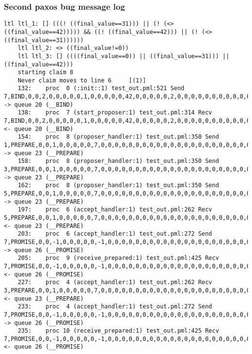 \subsubsection{Second paxos bug message log}
\begin{lstlisting}[xleftmargin=.01\linewidth, xrightmargin=0.01\linewidth, caption={Message passing caused by the proposer's protocol bug.}, label={lst:paxos_bug}]
    ltl ltl_1: [] (((! ((final_value==31))) || (! (<> ((final_value==42))))) && ((! ((final_value==42))) || (! (<> ((final_value==31))))))
    ltl ltl_2: <> ((final_value!=0))
    ltl ltl_3: [] ((((final_value==0)) || ((final_value==31))) || ((final_value==42)))
    starting claim 8
    Never claim moves to line 6     [(1)]
    132:    proc  0 (:init::1) test_out.pml:521 Send 7,BIND,0,0,2,0,0,0,0,0,1,0,0,0,0,0,42,0,0,0,0,0,2,0,0,0,0,0,0,0,0,0,0,0,0,0,0,0        -> queue 20 (__BIND)
    138:    proc  7 (start_proposer:1) test_out.pml:314 Recv 7,BIND,0,0,2,0,0,0,0,0,1,0,0,0,0,0,42,0,0,0,0,0,2,0,0,0,0,0,0,0,0,0,0,0,0,0,0,0        <- queue 20 (__BIND)
    154:    proc  8 (proposer_handler:1) test_out.pml:350 Send 1,PREPARE,0,0,1,0,0,0,0,0,7,0,0,0,0,0,0,0,0,0,0,0,0,0,0,0,0,0,0,0,0,0,0,0,0,0,0,0    -> queue 23 (__PREPARE)
    158:    proc  8 (proposer_handler:1) test_out.pml:350 Send 3,PREPARE,0,0,1,0,0,0,0,0,7,0,0,0,0,0,0,0,0,0,0,0,0,0,0,0,0,0,0,0,0,0,0,0,0,0,0,0    -> queue 23 (__PREPARE)
    162:    proc  8 (proposer_handler:1) test_out.pml:350 Send 5,PREPARE,0,0,1,0,0,0,0,0,7,0,0,0,0,0,0,0,0,0,0,0,0,0,0,0,0,0,0,0,0,0,0,0,0,0,0,0    -> queue 23 (__PREPARE)
    197:    proc  6 (accept_handler:1) test_out.pml:262 Recv 5,PREPARE,0,0,1,0,0,0,0,0,7,0,0,0,0,0,0,0,0,0,0,0,0,0,0,0,0,0,0,0,0,0,0,0,0,0,0,0      <- queue 23 (__PREPARE)
    203:    proc  6 (accept_handler:1) test_out.pml:272 Send 7,PROMISE,0,0,-1,0,0,0,0,0,-1,0,0,0,0,0,0,0,0,0,0,0,0,0,0,0,0,0,0,0,0,0,0,0,0,0,0,0    -> queue 26 (__PROMISE)
    205:    proc  9 (receive_prepared:1) test_out.pml:425 Recv 7,PROMISE,0,0,-1,0,0,0,0,0,-1,0,0,0,0,0,0,0,0,0,0,0,0,0,0,0,0,0,0,0,0,0,0,0,0,0,0,0  <- queue 26 (__PROMISE)
    227:    proc  4 (accept_handler:1) test_out.pml:262 Recv 3,PREPARE,0,0,1,0,0,0,0,0,7,0,0,0,0,0,0,0,0,0,0,0,0,0,0,0,0,0,0,0,0,0,0,0,0,0,0,0      <- queue 23 (__PREPARE)
    233:    proc  4 (accept_handler:1) test_out.pml:272 Send 7,PROMISE,0,0,-1,0,0,0,0,0,-1,0,0,0,0,0,0,0,0,0,0,0,0,0,0,0,0,0,0,0,0,0,0,0,0,0,0,0    -> queue 26 (__PROMISE)
    235:    proc 10 (receive_prepared:1) test_out.pml:425 Recv 7,PROMISE,0,0,-1,0,0,0,0,0,-1,0,0,0,0,0,0,0,0,0,0,0,0,0,0,0,0,0,0,0,0,0,0,0,0,0,0,0  <- queue 26 (__PROMISE)

\end{lstlisting}

